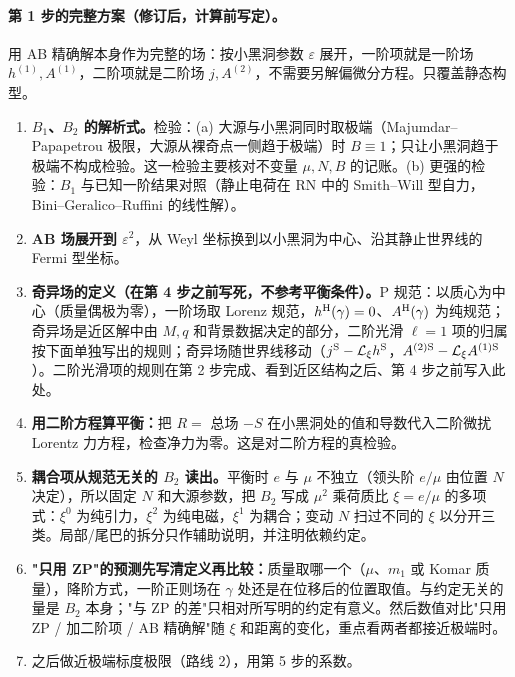 \documentclass[11pt,a4paper]{ctexart}
\numberwithin{equation}{section}
\begin{document}
\paragraph{第 1 步的完整方案（修订后，计算前写定）。}用 AB 精确解本身作为完整的场：按小黑洞参数 $\varepsilon$ 展开，一阶项就是一阶场 $h^{(1)},A^{(1)}$，二阶项就是二阶场 $j,A^{(2)}$，不需要另解偏微分方程。只覆盖静态构型。
\begin{enumerate}
\item \textbf{$B_1$、$B_2$ 的解析式。}检验：(a) 大源与小黑洞同时取极端（Majumdar--Papapetrou 极限，大源从裸奇点一侧趋于极端）时 $B\equiv1$；只让小黑洞趋于极端不构成检验。这一检验主要核对不变量 $\mu,N,B$ 的记账。(b) 更强的检验：$B_1$ 与已知一阶结果对照（静止电荷在 RN 中的 Smith--Will 型自力，Bini--Geralico--Ruffini 的线性解）。
\item \textbf{AB 场展开到 $\varepsilon^2$}，从 Weyl 坐标换到以小黑洞为中心、沿其静止世界线的 Fermi 型坐标。
\item \textbf{奇异场的定义（在第 4 步之前写死，不参考平衡条件）。}P 规范：以质心为中心（质量偶极为零），一阶场取 Lorenz 规范，$h^{\rm H}(\gamma)=0$、$A^{\rm H}(\gamma)$ 为纯规范；奇异场是近区解中由 $M,q$ 和背景数据决定的部分，二阶光滑 $\ell=1$ 项的归属按下面单独写出的规则；奇异场随世界线移动（$j^{\rm S}-\mathcal L_\xi h^{\rm S}$，$A^{(2){\rm S}}-\mathcal L_\xi A^{(1){\rm S}}$）。二阶光滑项的规则在第 2 步完成、看到近区结构之后、第 4 步之前写入此处。
\item \textbf{用二阶方程算平衡：}把 $R=$ 总场 $-S$ 在小黑洞处的值和导数代入二阶微扰 Lorentz 力方程，检查净力为零。这是对二阶方程的真检验。
\item \textbf{耦合项从规范无关的 $B_2$ 读出。}平衡时 $e$ 与 $\mu$ 不独立（领头阶 $e/\mu$ 由位置 $N$ 决定），所以固定 $N$ 和大源参数，把 $B_2$ 写成 $\mu^2$ 乘荷质比 $\xi=e/\mu$ 的多项式：$\xi^0$ 为纯引力，$\xi^2$ 为纯电磁，$\xi^1$ 为耦合；变动 $N$ 扫过不同的 $\xi$ 以分开三类。局部/尾巴的拆分只作辅助说明，并注明依赖约定。
\item \textbf{"只用 ZP"的预测先写清定义再比较：}质量取哪一个（$\mu$、$m_1$ 或 Komar 质量），降阶方式，一阶正则场在 $\gamma$ 处还是在位移后的位置取值。与约定无关的量是 $B_2$ 本身；"与 ZP 的差"只相对所写明的约定有意义。然后数值对比"只用 ZP / 加二阶项 / AB 精确解"随 $\xi$ 和距离的变化，重点看两者都接近极端时。
\item 之后做近极端标度极限（路线 2），用第 5 步的系数。
\end{enumerate}
\end{document}
